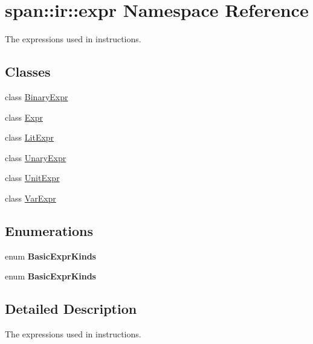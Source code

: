 \hypertarget{namespacespan_1_1ir_1_1expr}{}\section{span\+:\+:ir\+:\+:expr Namespace Reference}
\label{namespacespan_1_1ir_1_1expr}


The expressions used in instructions.  


\subsection*{Classes}
\begin{DoxyCompactItemize}
\item 
class \hyperlink{classspan_1_1ir_1_1expr_1_1BinaryExpr}{Binary\+Expr}
\item 
class \hyperlink{classspan_1_1ir_1_1expr_1_1Expr}{Expr}
\item 
class \hyperlink{classspan_1_1ir_1_1expr_1_1LitExpr}{Lit\+Expr}
\item 
class \hyperlink{classspan_1_1ir_1_1expr_1_1UnaryExpr}{Unary\+Expr}
\item 
class \hyperlink{classspan_1_1ir_1_1expr_1_1UnitExpr}{Unit\+Expr}
\item 
class \hyperlink{classspan_1_1ir_1_1expr_1_1VarExpr}{Var\+Expr}
\end{DoxyCompactItemize}
\subsection*{Enumerations}
\begin{DoxyCompactItemize}
\item 
\mbox{\label{namespacespan_1_1ir_1_1expr_a1ff9748775e6afa9d780f7cd8e2fd682}} 
enum {\bfseries Basic\+Expr\+Kinds} 
\item 
\mbox{\label{namespacespan_1_1ir_1_1expr_a1ff9748775e6afa9d780f7cd8e2fd682}} 
enum {\bfseries Basic\+Expr\+Kinds} 
\end{DoxyCompactItemize}


\subsection{Detailed Description}
The expressions used in instructions. 